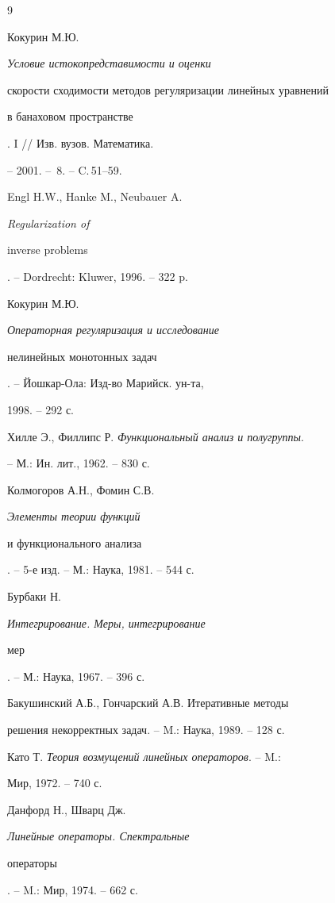 \begin{thebibliography}{9}







Кокурин М.Ю. {\em Условие истокопредставимости и оценки 


скорости сходимости методов регуляризации линейных уравнений 


в банаховом пространстве}. I // Изв. вузов. Математика.


-- 2001. -- \No\,8. -- C.\,51--59.




Engl H.W., Hanke M., Neubauer A. {\em Regularization of 


inverse problems}. -- Dordrecht: Kluwer, 1996. -- 322 p.




Кокурин М.Ю. {\em Операторная регуляризация и исследование 


нелинейных монотонных задач}. -- Йошкар-Ола: Изд-во Марийск. ун-та,


1998. -- 292 с.




Хилле Э., Филлипс Р. {\em Функциональный анализ и полугруппы}.


-- М.: Ин. лит., 1962. -- 830 с. 




Колмогоров А.Н., Фомин С.В. {\em Элементы теории функций


и функционального анализа}. -- 5-е изд. -- М.: Наука, 1981. -- 544 с.




Бурбаки Н. {\em Интегрирование. Меры, интегрирование 


мер}. -- М.: Наука, 1967. -- 396 с.




Бакушинский А.Б., Гончарский А.В. Итеративные методы 


решения некорректных задач. -- M.: Наука, 1989. -- 128 с.




Като Т. {\em Теория возмущений линейных операторов}. -- M.:


Мир, 1972. -- 740 с.




Данфорд Н., Шварц Дж. {\em Линейные операторы. Спектральные 


операторы}. -- M.: Мир, 1974. -- 662 с.








\end{thebibliography}





\vskip 2cm












\label{end}








